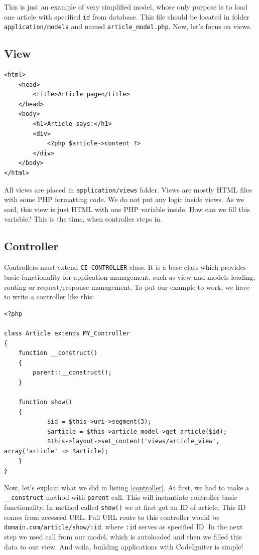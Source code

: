 This is just an example of very simplified model, whose only purpose is to load one article with specified \texttt{id} from database. This file should be located in folder \texttt{application/models} and named \texttt{article\_model.php}.   Now, let's focus on views.

\subsection{View}

\begin{lstlisting}[label={view}, caption={Article view}]
<html>
	<head>
		<title>Article page</title>
	</head>
	<body>
		<h1>Article says:</h1>
		<div>
			<?php $article->content ?>
		</div>
	</body>
</html>
\end{lstlisting}


All views are placed in \texttt{application/views} folder. Views are mostly HTML files with some PHP formatting code. We do not put any logic inside views. As we said, this view is just HTML with one PHP variable inside. How can we fill this variable? This is the time, when controller steps in.

\subsection{Controller}
Controllers must extend \texttt{CI\_CONTROLLER} class. It is a base class which provides basic functionality for application management, such as view and models loading, routing or request/response management. To put our example to work, we have to write a controller like this:

\begin{lstlisting}[label={controller}, caption={Article controller}]
<?php

class Article extends MY_Controller
{
    function __construct()
    {
        parent::__construct();
    }

    function show()
    {
    		$id = $this->uri->segment(3);
    		$article = $this->article_model->get_article($id);
    		$this->layout->set_content('views/article_view', array('article' => $article);
    }
}
\end{lstlisting}


Now, let's explain what we did in listing \ref{controller}. At first, we had to make a \texttt{\_\_construct} method with \texttt{parent} call. This will instantiate controller basic functionality. In method called \texttt{show()} we at first got an ID of article. This ID comes from accessed URL. Full URL route to this controller would be \texttt{domain.com/article/show/:id}, where \texttt{:id} serves as specified ID. In the next step we used call from our model, which is autoloaded and then we filled this data to our view. And voila, building applications with CodeIgniter is simple!

